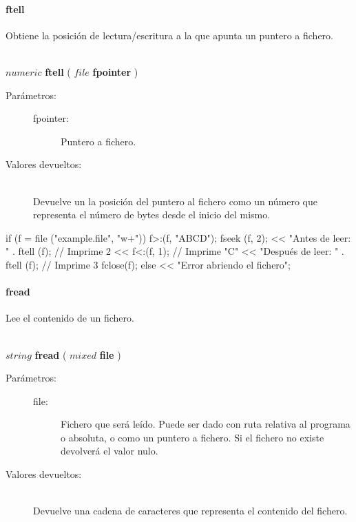 \paragraph{ftell}
Obtiene la posición de lectura/escritura a la que apunta un puntero a fichero.

\begin{framed}
\hfill \\ $numeric$ \textbf{ftell} ( $file$ \textbf{fpointer}  )  
\begin{description}
\item [Parámetros:] \hfill 
   \begin{description}
   \item[fpointer:] Puntero a fichero. 
   \end{description}
\item[Valores devueltos:] \hfill \\
   Devuelve un la posición del puntero al fichero como un número que representa el
   número de bytes desde el inicio del mismo. 
\end{description}
\end{framed}

\begin{myverbatim}  
   if (f = file ("example.file", "w+")){
      f>:(f, "ABCD");
      fseek (f, 2);
      << "Antes de leer: " . ftell (f); // Imprime 2
      << f<:(f, 1); // Imprime "C"
      << "Después de leer: " . ftell (f); // Imprime 3
      fclose(f);
   } else {
      << "Error abriendo el fichero";
   }
\end{myverbatim}

\paragraph{fread}
Lee el contenido de un fichero.

\begin{framed}
\hfill \\ $string$ \textbf{fread} ( $mixed$ \textbf{file}  )  
\begin{description}
\item [Parámetros:] \hfill 
   \begin{description}
   \item[file:] Fichero que será leído. Puede ser dado con ruta relativa al programa o absoluta, o como un puntero a fichero. Si el fichero no existe
   devolverá el valor nulo.
   \end{description}
\item[Valores devueltos:] \hfill \\
   Devuelve una cadena de caracteres que representa el contenido del fichero.
\end{description}
\end{framed}

